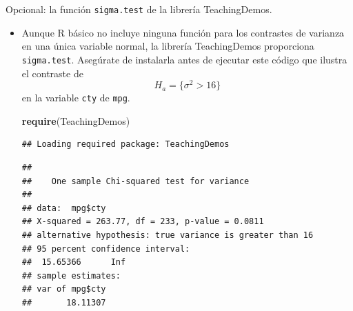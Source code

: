 \documentclass[
  9pt,
  ignorenonframetext,
]{beamer}
\newenvironment{Shaded}{\begin{snugshade}}{\end{snugshade}}
\newcommand{\DataTypeTok}[1]{\textcolor[rgb]{0.13,0.29,0.53}{#1}}
\newcommand{\DecValTok}[1]{\textcolor[rgb]{0.00,0.00,0.81}{#1}}
\newcommand{\FloatTok}[1]{\textcolor[rgb]{0.00,0.00,0.81}{#1}}
\newcommand{\KeywordTok}[1]{\textcolor[rgb]{0.13,0.29,0.53}{\textbf{#1}}}
\newcommand{\NormalTok}[1]{#1}
\newcommand{\OperatorTok}[1]{\textcolor[rgb]{0.81,0.36,0.00}{\textbf{#1}}}
\newcommand{\StringTok}[1]{\textcolor[rgb]{0.31,0.60,0.02}{#1}}
\begin{document}
\begin{frame}[fragile]{Opcional: la función \texttt{sigma.test} de la
librería TeachingDemos.}
\protect\hypertarget{opcional-la-funcion-sigma.test-de-la-libreria-teachingdemos.}{}

\begin{itemize}
\item
  Aunque R básico no incluye ninguna función para los contrastes de
  varianza en una única variable normal, la librería TeachingDemos
  proporciona \texttt{sigma.test}. Asegúrate de instalarla antes de
  ejecutar este código que ilustra el contraste de
  \[H_a = \{\sigma^2 > 16\}\] en la variable \texttt{cty} de
  \texttt{mpg}.\small

\begin{Shaded}
\begin{Highlighting}[]
\KeywordTok{require}\NormalTok{(TeachingDemos)}
\end{Highlighting}
\end{Shaded}

\begin{verbatim}
## Loading required package: TeachingDemos
\end{verbatim}

\begin{Shaded}
\end{Shaded}

\begin{verbatim}
## 
##    One sample Chi-squared test for variance
## 
## data:  mpg$cty
## X-squared = 263.77, df = 233, p-value = 0.0811
## alternative hypothesis: true variance is greater than 16
## 95 percent confidence interval:
##  15.65366      Inf
## sample estimates:
## var of mpg$cty 
##       18.11307
\end{verbatim}

  \normalsize
\end{itemize}

\end{frame}
\end{document}

